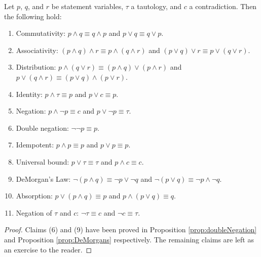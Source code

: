 \guard











\begin{thm}
\label{thm:logicalEquivalences}
  Let $p$, $q$, and $r$ be statement variables, $\tau$ a tautology, and $c$ a contradiction.
  Then the following hold:
  \begin{enumerate}
    \item Commutativity: $p\wedge q\equiv q\wedge p$ and $p\vee q\equiv q\vee p$.
    \item Associativity: $(p\wedge q)\wedge r \equiv p\wedge(q\wedge r)$ and $(p\vee q)\vee r \equiv p\vee(q\vee r)$.
    \item Distribution: $p\wedge(q\vee r)\equiv (p\wedge q)\vee(p\wedge r)$ and $p\vee(q\wedge r)\equiv (p\vee q)\wedge(p\vee r)$.
    \item Identity: $p\wedge \tau\equiv p$ and $p\vee c \equiv p$.
    \item Negation: $p\wedge\neg p \equiv c$ and $p\vee\neg p \equiv \tau$.
    \item Double negation: $\neg\neg p \equiv p$.
    \item Idempotent: $p\wedge p\equiv p$ and $p\vee p \equiv p$.
    \item Universal bound: $p\vee\tau\equiv\tau$ and $p\wedge c\equiv c $.
    \item DeMorgan's Law: $\neg(p\wedge q) \equiv \neg p \vee \neg q$ and $\neg(p\vee q) \equiv \neg p \wedge \neg q$.
    \item Absorption: $p\vee(p\wedge q)\equiv p$ and $p\wedge(p\vee q)\equiv q$.
    \item Negation of $\tau$ and $c$: $\neg\tau\equiv c$ and $\neg c \equiv \tau$.
  \end{enumerate}
\end{thm}
\begin{proof}
  Claims (6) and (9) have been proved in Proposition \ref{prop:doubleNegation} and Proposition \ref{prop:DeMorgans} respectively.
  The remaining claims are left as an exercise to the reader.
\end{proof}



